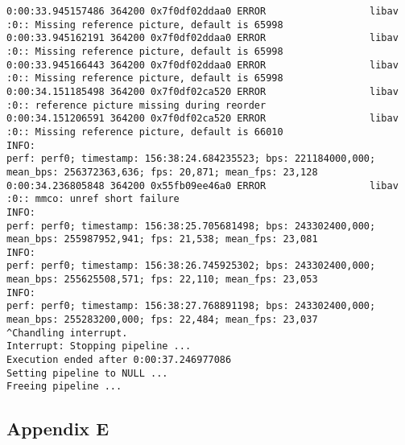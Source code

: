 \documentclass[12pt,oneside]{book}
\begin{document}
\begin{lstlisting}
0:00:33.945157486 364200 0x7f0df02ddaa0 ERROR                  libav :0:: Missing reference picture, default is 65998
0:00:33.945162191 364200 0x7f0df02ddaa0 ERROR                  libav :0:: Missing reference picture, default is 65998
0:00:33.945166443 364200 0x7f0df02ddaa0 ERROR                  libav :0:: Missing reference picture, default is 65998
0:00:34.151185498 364200 0x7f0df02ca520 ERROR                  libav :0:: reference picture missing during reorder
0:00:34.151206591 364200 0x7f0df02ca520 ERROR                  libav :0:: Missing reference picture, default is 66010
INFO:
perf: perf0; timestamp: 156:38:24.684235523; bps: 221184000,000; mean_bps: 256372363,636; fps: 20,871; mean_fps: 23,128
0:00:34.236805848 364200 0x55fb09ee46a0 ERROR                  libav :0:: mmco: unref short failure
INFO:
perf: perf0; timestamp: 156:38:25.705681498; bps: 243302400,000; mean_bps: 255987952,941; fps: 21,538; mean_fps: 23,081
INFO:
perf: perf0; timestamp: 156:38:26.745925302; bps: 243302400,000; mean_bps: 255625508,571; fps: 22,110; mean_fps: 23,053
INFO:
perf: perf0; timestamp: 156:38:27.768891198; bps: 243302400,000; mean_bps: 255283200,000; fps: 22,484; mean_fps: 23,037
^Chandling interrupt.
Interrupt: Stopping pipeline ...
Execution ended after 0:00:37.246977086
Setting pipeline to NULL ...
Freeing pipeline ...
\end{lstlisting}

\subsection*{Appendix E}
\end{document}
